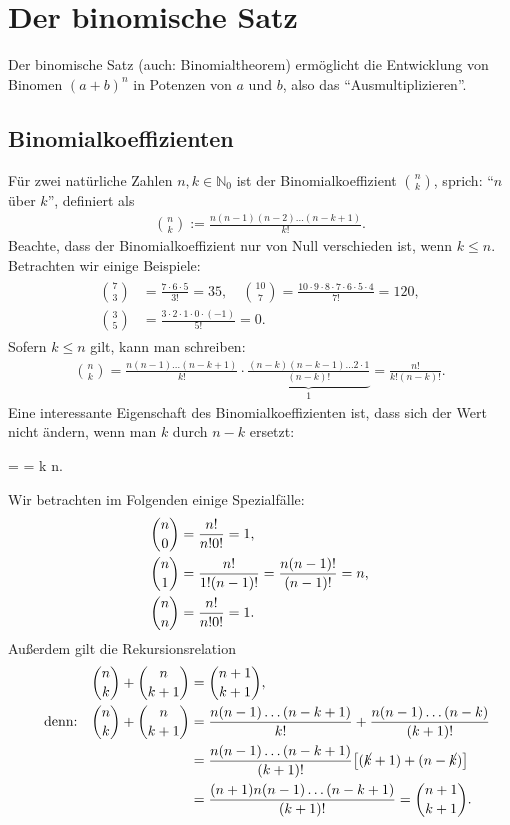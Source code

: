 \section{Der binomische Satz}

Der binomische Satz (auch: Binomialtheorem) ermöglicht die Entwicklung von Binomen $(a+b)^n$ in Potenzen von $a$ und $b$, also das ``Ausmultiplizieren''. 

\subsection{Binomialkoeffizienten}
Für zwei natürliche Zahlen $n,k \in \mathbb{N}_0$ ist der Binomialkoeffizient $\binom{n}{k}$, sprich: ``$n$ über $k$'', definiert als 
\begin{align}
    \binom{n}{k} := \frac{n(n-1)(n-2)\hdots (n-k+1)}{k!}.
\end{align}
Beachte, dass der Binomialkoeffizient nur von Null verschieden ist, wenn $k \le n$. Betrachten wir einige Beispiele: 
\begin{align}
    \begin{split}
        \binom{7}{3} &= \frac{7\cdot 6\cdot 5}{3!} = 35, \quad \binom{10}{7} = \frac{10\cdot 9 \cdot 8 \cdot 7 \cdot 6 \cdot 5 \cdot 4}{7!} = 120, \\
        \binom{3}{5} &= \frac{3 \cdot 2 \cdot 1 \cdot 0 \cdot (-1)}{5!} = 0.
    \end{split}
\end{align}
Sofern $k \le n$ gilt, kann man schreiben: 
\begin{align}
    \binom{n}{k} = \frac{n(n-1)\hdots (n-k+1)}{k!} \cdot \underbrace{\frac{(n-k)(n-k-1)\hdots 2 \cdot 1}{(n-k)!}}_{1} = \frac{n!}{k!(n-k)!}.
\end{align}
Eine interessante Eigenschaft des Binomialkoeffizienten ist, dass sich der Wert nicht ändern, wenn man $k$ durch $n-k$ ersetzt:
\begin{mymathbox}[ams align, title={Binomialkoeffizent}, colframe={FSUblau}]
 =  \qq{,}  =   k \le n.
\end{mymathbox}

Wir betrachten im Folgenden einige Spezialfälle: 
\begin{align}
    \binom{n}{0} &= \frac{n!}{n! 0!} = 1, \notag \\
    \binom{n}{1} &= \frac{n!}{1!(n-1)!} = \frac{n(n-1)!}{(n-1)!} =n, \\
    \binom{n}{n} &= \frac{n!}{n! 0!} = 1. \notag
\end{align}
Außerdem gilt die Rekursionsrelation 
\begin{align}
    \binom{n}{k} + \binom{n}{k+1} &= \binom{n+1}{k+1}, \label{eqn:11_Rekursion}\\
    \qq{denn:} \binom{n}{k} + \binom{n}{k+1} &= \frac{n(n-1)\hdots (n-k+1)}{k!} + \frac{n(n-1)\hdots (n-k)}{(k+1)!} \notag \\
    &= \frac{n(n-1)\hdots (n-k+1)}{(k+1)!} \qty[(\cancel{k}+1)+(n-\cancel{k})] \notag \\
    &= \frac{(n+1)n(n-1) \hdots (n-k+1)}{(k+1)!} = \binom{n+1}{k+1}.
\end{align}

